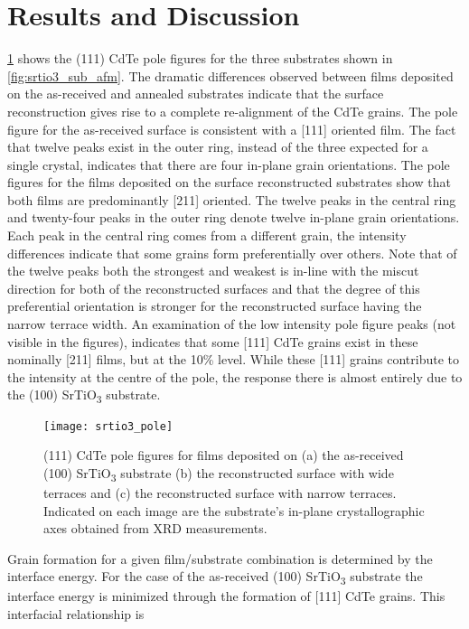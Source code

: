 \section{Results and Discussion}
\cref{fig:srtio3_pole} shows the (111) CdTe pole figures for the three substrates
shown in \cref{fig:srtio3_sub_afm}. The dramatic differences observed between films
deposited on the as-received and annealed substrates indicate that
the surface reconstruction gives rise to a complete re-alignment of
the CdTe grains. The pole figure for the as-received surface is
consistent with a [111] oriented film. The fact that twelve peaks
exist in the outer ring, instead of the three expected for a single
crystal, indicates that there are four in-plane grain orientations.
The pole figures for the films deposited on the surface reconstructed substrates show that both films are predominantly [211]
oriented. The twelve peaks in the central ring and twenty-four
peaks in the outer ring denote twelve in-plane grain orientations. Each peak in the central ring comes from a different grain, the intensity differences indicate that some grains form
preferentially over others. Note that of the twelve peaks both
the strongest and weakest is in-line with the miscut direction for
both of the reconstructed surfaces and that the degree of this
preferential orientation is stronger for the reconstructed surface
having the narrow terrace width. An examination of the low
intensity pole figure peaks (not visible in the figures), indicates that
some [111] CdTe grains exist in these nominally [211] films, but
at the 10\% level. While these [111] grains contribute to
the intensity at the centre of the pole, the response there is almost
entirely due to the (100) SrTiO\textsubscript{3} substrate.
\begin{figure}
    \centering
    \texttt{[image: srtio3\_pole]}
    \caption[Pole figures of CdTe grown on SrTiO\textsubscript{3}]{\label{fig:srtio3_pole}(111) CdTe pole figures for films deposited on (a) the as-received (100) SrTiO\textsubscript{3} substrate (b) the reconstructed surface with wide terraces and (c) the reconstructed surface with narrow terraces. Indicated on each image are the substrate’s in-plane crystallographic axes obtained from XRD measurements.}
\end{figure}
Grain formation for a given film/substrate combination is
determined by the interface energy. For the case of the as-received
(100) SrTiO\textsubscript{3} substrate the interface energy is minimized through
the formation of [111] CdTe grains. This interfacial relationship is

